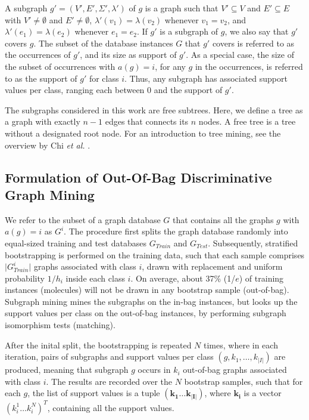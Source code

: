 \documentclass{article}
\begin{document}
A subgraph $g'=(V',E',\Sigma',\lambda')$ of $g$ is a graph such that $V'
\subseteq V$ and $E' \subseteq E$ with $V' \ne \emptyset$ and $E' \ne
\emptyset$, $\lambda'(v_1)=\lambda(v_2)$ whenever $v_1=v_2$, and
$\lambda'(e_1)=\lambda(e_2)$ whenever $e_1=e_2$.  If $g'$ is a subgraph of $g$,
we also say that $g'$ covers $g$.  The subset of the database instances $G$
that $g'$ covers is referred to as the occurrences of $g'$, and its size as
support of $g'$.  
As a special case, the size of the subset of occurrences with $a(g)=i$,
for any $g$ in the occurrences, is referred to as the support of $g'$ for class
$i$. Thus, any subgraph has associated support values per class, ranging each between 0 and the support of $g'$.

The subgraphs considered in this work are free subtrees. Here, we define a tree as a graph
with exactly $n-1$ edges that connects its $n$ nodes. A free tree is a tree
without a designated root node. For an introduction to tree mining, see the
overview by Chi \emph{et al.} \cite{CMNK01Frequent}.

\subsection{Formulation of Out-Of-Bag Discriminative Graph Mining}
\label{ss:oob-dgm}

We refer to the subset of a graph database $G$ that contains all the graphs $g$
with $a(g)=i$ as $G^i$.  The procedure first splits the graph database randomly
into equal-sized training and test databases $G_{Train}$ and $G_{Test}$.
Subsequently, stratified bootstrapping is performed on the training data, such
that each sample comprises $\vert G_{Train}^i\vert$ graphs associated with
class $i$, drawn with replacement and uniform probability $1/h_i$ inside each
class $i$.  On average, about 37\% (1/$e$) of training instances (molecules)
will not be drawn in any bootstrap sample (out-of-bag). Subgraph mining mines
the subgraphs on the in-bag instances, but looks up the support values per
class on the out-of-bag instances, by performing subgraph isomorphism tests
(matching).

After the inital split, the bootstrapping is repeated $N$ times, where in each
iteration, pairs of subgraphs and support values per class
$(g,k_1,\ldots,k_{\vert I\vert})$ are produced, meaning that subgraph $g$
occurs in $k_i$ out-of-bag graphs associated with class $i$. The results are
recorded over the $N$ bootstrap samples, such that for each $g$, the list of
support values is a tuple $(\mathbf{k_1}\ldots\mathbf{k_{\vert I\vert}})$,
where $\mathbf{k_i}$ is a vector $(k_i^1\ldots k_i^N)^T$, containing all the
support values.  
\end{document}
